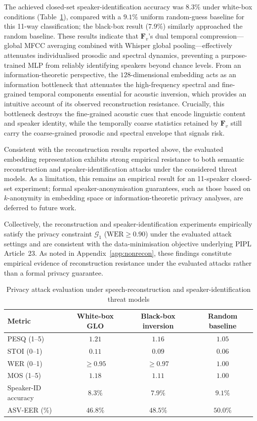\documentclass[a4paper,fleqn]{cas-sc}
\begin{document}
The achieved closed-set speaker-identification accuracy was $8.3\%$ under white-box conditions (Table~\ref{tab:privacy_attack-en}), compared with a $9.1\%$ uniform random-guess baseline for this 11-way classification; the black-box result ($7.9\%$) similarly approached the random baseline. These results indicate that $\mathbf{F}_v$'s dual temporal compression---global MFCC averaging combined with Whisper global pooling---effectively attenuates individualised prosodic and spectral dynamics, preventing a purpose-trained MLP from reliably identifying speakers beyond chance levels. From an information-theoretic perspective, the $128$-dimensional embedding acts as an information bottleneck that attenuates the high-frequency spectral and fine-grained temporal components essential for acoustic inversion, which provides an intuitive account of its observed reconstruction resistance. Crucially, this bottleneck destroys the fine-grained acoustic cues that encode linguistic content and speaker identity, while the temporally coarse statistics retained by $\bm{F}_v$ still carry the coarse-grained prosodic and spectral envelope that signals risk.

Consistent with the reconstruction results reported above, the evaluated embedding representation exhibits strong empirical resistance to both semantic reconstruction and speaker-identification attacks under the considered threat models. As a limitation, this remains an empirical result for an 11-speaker closed-set experiment; formal speaker-anonymisation guarantees, such as those based on $k$-anonymity in embedding space or information-theoretic privacy analyses, are deferred to future work.

Collectively, the reconstruction and speaker-identification experiments empirically satisfy the privacy constraint $\mathcal{G}_1$ ($\text{WER} \ge 0.90$) under the evaluated attack settings and are consistent with the data-minimisation objective underlying PIPL Article~23. As noted in Appendix~\ref{app:nonrecon}, these findings constitute empirical evidence of reconstruction resistance under the evaluated attacks rather than a formal privacy guarantee.

\begin{table}[!t]
\centering
\caption{Privacy attack evaluation under speech-reconstruction and speaker-identification threat models}
\label{tab:privacy_attack-en}
\renewcommand{\arraystretch}{1.1}
\begin{tabular}{l c c c}
\toprule
\textbf{Metric} & \textbf{White-box GLO} & \textbf{Black-box inversion} & \textbf{Random baseline} \\
\midrule
PESQ (1--5) & $1.21$ & $1.16$ & $1.05$ \\
STOI (0--1) & $0.11$ & $0.09$ & $0.06$ \\
WER (0--1) & $\ge 0.95$ & $\ge 0.97$ & $1.00$ \\
MOS (1--5) & $1.18$ & $1.11$ & $1.00$ \\
Speaker-ID accuracy & $8.3\%$ & $7.9\%$ & $9.1\%$ \\
ASV-EER (\%) & $46.8\%$ & $48.5\%$ & $50.0\%$ \\
\bottomrule
\end{tabular}
\end{table}
\end{document}
